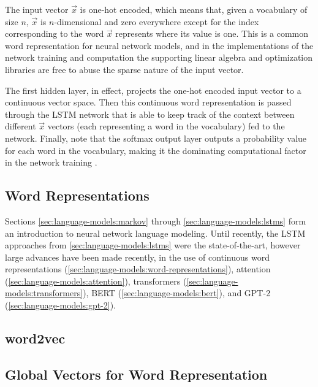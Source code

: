 The input vector $\vec x$ is one-hot encoded, which means that, given a vocabulary of size $n$, $\vec x$ is $n$-dimensional and zero everywhere except for the index corresponding to the word $\vec x$ represents where its value is one.
This is a common word representation for neural network models, and in the implementations of the network training and computation the supporting linear algebra and optimization libraries are free to abuse the sparse nature of the input vector.

The first hidden layer, in effect, projects the one-hot encoded input vector to a continuous vector space.
Then this continuous word representation is passed through the LSTM network that is able to keep track of the context between different $\vec x$ vectors (each representing a word in the vocabulary) fed to the network.
Finally, note that the softmax output layer outputs a probability value for each word in the vocabulary, making it the dominating computational factor in the network training \cite{Sundermeyer2012LSTMNN}.

\subsection{Word Representations}\label{sec:language-models:word-representations}
Sections \autoref{sec:language-models:markov} through \autoref{sec:language-models:lstms} form an introduction to neural network language modeling.
Until recently, the LSTM approaches from \autoref{sec:language-models:lstms} were the state-of-the-art, however large advances have been made recently, in the use of continuous word representations (\autoref{sec:language-models:word-representations}), attention (\autoref{sec:language-models:attention}), transformers (\autoref{sec:language-models:transformers}), BERT (\autoref{sec:language-models:bert}), and GPT-2 (\autoref{sec:language-models:gpt-2}).


\subsection{word2vec}\label{sec:language-models:word2vec}
\subsection{Global Vectors for Word Representation}\label{sec:language-models:glove}

